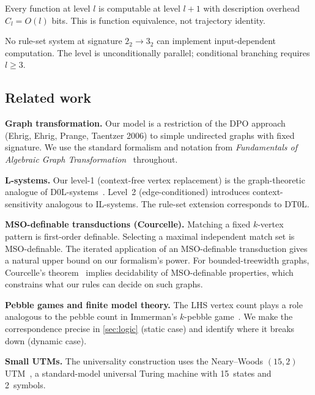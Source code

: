 \documentclass{../shared/primo}
\begin{document}
\begin{theorem}\label{thm:bridge}
Every function at level $l$ is computable at level $l+1$ with description overhead $C_l = O(l)$ bits. This is function equivalence, not trajectory identity.
\end{theorem}

\begin{theorem}\label{thm:unconditional}
No rule-set system at signature $2_2 \to 3_2$ can implement input-dependent computation. The level is unconditionally parallel; conditional branching requires $l \geq 3$.
\end{theorem}

\subsection{Related work}

\textbf{Graph transformation.} Our model is a restriction of the DPO approach (Ehrig, Ehrig, Prange, Taentzer 2006) to simple undirected graphs with fixed signature. We use the standard formalism and notation from \emph{Fundamentals of Algebraic Graph Transformation}~\cite{ehrig2006fundamentals} throughout.

\textbf{L-systems.} Our level-1 (context-free vertex replacement) is the graph-theoretic analogue of D0L-systems~\cite{rozenberg1980mathematical}. Level~2 (edge-conditioned) introduces context-sensitivity analogous to IL-systems. The rule-set extension corresponds to DT0L.

\textbf{MSO-definable transductions (Courcelle).} Matching a fixed $k$-vertex pattern is first-order definable. Selecting a maximal independent match set is MSO-definable. The iterated application of an MSO-definable transduction gives a natural upper bound on our formalism's power. For bounded-treewidth graphs, Courcelle's theorem~\cite{courcelle1990monadic,courcelle2012graph} implies decidability of MSO-definable properties, which constrains what our rules can decide on such graphs.

\textbf{Pebble games and finite model theory.} The LHS vertex count plays a role analogous to the pebble count in Immerman's $k$-pebble game~\cite{immerman1982upper}. We make the correspondence precise in \cref{sec:logic} (static case) and identify where it breaks down (dynamic case).

\textbf{Small UTMs.} The universality construction uses the Neary--Woods $(15,2)$ UTM~\cite{neary2009four}, a standard-model universal Turing machine with 15~states and 2~symbols.
\end{document}
